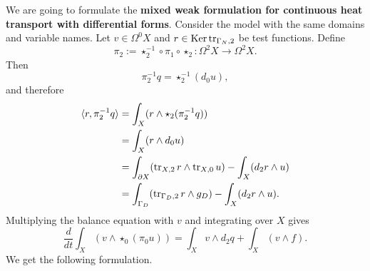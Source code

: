 \begin{discussion}
  We are going to formulate the \textbf{mixed weak formulation for continuous
  heat transport with differential forms}.
  Consider the model
  with the same domains and variable names.
  Let $v \in \Omega^0 X$ and $r \in \mathop{\rm Ker}\nolimits \mathop{\rm tr}\nolimits_{\Gamma_N, 2}$ be test functions.
  Define
  \begin{equation}
    \pi_2 :=
    \star_2^{-1} \circ \pi_1 \circ \star_2 \colon \Omega^2 X \to \Omega^2 X.
  \end{equation}
  Then
  \begin{equation}
    \pi_2^{-1} q = \star_2^{-1} (d_0 u),
  \end{equation}
  and therefore
  \begin{equation}
    \begin{split}
      \langle r,\pi_2^{-1} q\rangle
      & = \int_X (r \wedge \star_2 (\pi_2^{-1} q)) \\
      & = \int_X (r \wedge d_0 u) \\
      & = \int_{\partial X} (\mathop{\rm tr}\nolimits_{X, 2} r \wedge \mathop{\rm tr}\nolimits_{X, 0} u)
        - \int_{X} (d_2 r \wedge u) \\
      & = \int_{\Gamma_D} (\mathop{\rm tr}\nolimits_{\Gamma_D, 2} r \wedge g_D)
        - \int_{X} (d_2 r \wedge u).
    \end{split}
  \end{equation}
  Multiplying the balance equation with $v$ and integrating over $X$ gives
  \begin{equation}
    \frac{d}{d t} \int_X (v \wedge \star_0 (\pi_0 u))
    = \int_X v \wedge d_2 q + \int_X (v \wedge f).
  \end{equation}
  We get the following formulation.
\end{discussion}
